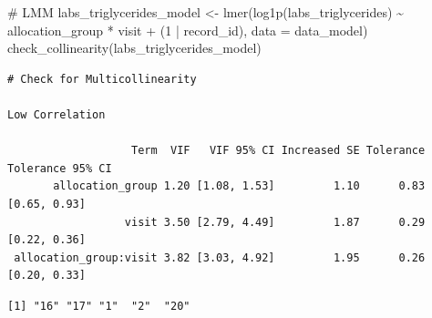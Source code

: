 \documentclass[
  12pt,
]{article}
\newenvironment{Shaded}{\begin{snugshade}}{\end{snugshade}}
\newcommand{\AttributeTok}[1]{\textcolor[rgb]{0.40,0.45,0.13}{#1}}
\newcommand{\CommentTok}[1]{\textcolor[rgb]{0.37,0.37,0.37}{#1}}
\newcommand{\DecValTok}[1]{\textcolor[rgb]{0.68,0.00,0.00}{#1}}
\newcommand{\FunctionTok}[1]{\textcolor[rgb]{0.28,0.35,0.67}{#1}}
\newcommand{\NormalTok}[1]{\textcolor[rgb]{0.00,0.23,0.31}{#1}}
\newcommand{\OtherTok}[1]{\textcolor[rgb]{0.00,0.23,0.31}{#1}}
\newcommand{\SpecialCharTok}[1]{\textcolor[rgb]{0.37,0.37,0.37}{#1}}
\newcommand{\StringTok}[1]{\textcolor[rgb]{0.13,0.47,0.30}{#1}}
\begin{document}
\begin{Shaded}
\begin{Highlighting}[]
\CommentTok{\# LMM}
\NormalTok{labs\_triglycerides\_model }\OtherTok{\textless{}{-}} \FunctionTok{lmer}\NormalTok{(}\FunctionTok{log1p}\NormalTok{(labs\_triglycerides) }\SpecialCharTok{\textasciitilde{}}\NormalTok{ allocation\_group }\SpecialCharTok{*}\NormalTok{ visit }\SpecialCharTok{+} 
\NormalTok{(}\DecValTok{1} \SpecialCharTok{|}\NormalTok{ record\_id), }\AttributeTok{data =}\NormalTok{ data\_model)}
\FunctionTok{check\_collinearity}\NormalTok{(labs\_triglycerides\_model)}
\end{Highlighting}
\end{Shaded}

\begin{verbatim}
# Check for Multicollinearity

Low Correlation

                   Term  VIF   VIF 95% CI Increased SE Tolerance Tolerance 95% CI
       allocation_group 1.20 [1.08, 1.53]         1.10      0.83     [0.65, 0.93]
                  visit 3.50 [2.79, 4.49]         1.87      0.29     [0.22, 0.36]
 allocation_group:visit 3.82 [3.03, 4.92]         1.95      0.26     [0.20, 0.33]
\end{verbatim}

\begin{Shaded}
\end{Shaded}

\begin{verbatim}
[1] "16" "17" "1"  "2"  "20"
\end{verbatim}
\end{document}
